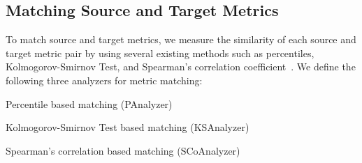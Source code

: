 \subsection{Matching Source and Target Metrics}
\label{sec:analyzers}

To match source and target metrics, we measure the similarity of each source and
target metric pair by using several existing methods such as percentiles,
Kolmogorov-Smirnov Test, and Spearman's correlation
coefficient~\cite{Massey51,Spearman10}.
We define the following three analyzers
for metric matching:
\vspace{-0.2em}
\squishlist
	\item Percentile based matching (PAnalyzer)
	\item Kolmogorov-Smirnov Test based matching (KSAnalyzer)
	\item Spearman's correlation based matching (SCoAnalyzer)
\squishend

% 
% 

